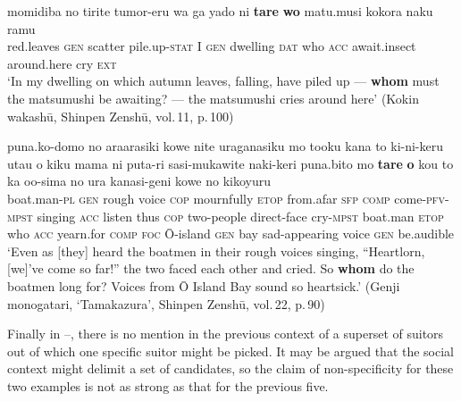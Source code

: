 \documentclass[output=paper]{LSP/langsci}
\begin{document}
\begin{exe}
\ex%
\label{07-fr-ex:41}
\gll momidiba no tirite tumor-eru wa ga yado ni \textbf{tare} \textbf{wo} matu.musi kokora naku ramu\\
red.leaves \textsc{gen} scatter pile.up-\textsc{stat} I \textsc{gen} dwelling \textsc{dat}  who \textsc{acc} await.insect around.here cry \textsc{ext}\\
\glt ‘In my dwelling on which autumn leaves, falling, have piled up — \textbf{whom} must the matsumushi be awaiting? — the matsumushi cries around here’  (Kokin wakashū, Shinpen Zenshū, vol.\,11, p.\,100)
\end{exe}

\begin{exe}
\ex%
\label{07-fr-ex:42}
\gll puna.ko-domo no araarasiki kowe nite uraganasiku mo tooku kana to ki-ni-keru utau o kiku mama ni puta-ri sasi-mukawite naki-keri puna.bito mo \textbf{tare} \textbf{o} kou to ka oo{-}sima no ura kanasi-geni kowe no kikoyuru\\
boat.man-\textsc{pl} \textsc{gen} rough voice \textsc{cop} mournfully \textsc{etop} from.afar \textsc{sfp} \textsc{comp} come-\textsc{pfv}-\textsc{mpst} singing \textsc{acc} listen thus \textsc{cop} two-people direct-face cry-\textsc{mpst} boat.man \textsc{etop}  who \textsc{acc} yearn.for \textsc{comp} \textsc{foc} \=O{}-island \textsc{gen} bay sad-appearing voice \textsc{gen} be.audible\\
\glt ‘Even as [they] heard the boatmen in their rough voices singing, “Heartlorn, [we]’ve come so far!” the two faced each other and cried. So \textbf{whom} do the boatmen long for? Voices from \=O Island Bay sound so heartsick.’  (Genji monogatari, ‘Tamakazura’, Shinpen Zenshū, vol.\,22, p.\,90)
\end{exe}

Finally in --, there is no mention in the previous context of a  superset of suitors out of which one specific suitor might be picked. It may be argued that the social context might delimit a  set of candidates, so the claim of non-specificity for these two examples is not as strong as that for the previous five. 
\end{document}
